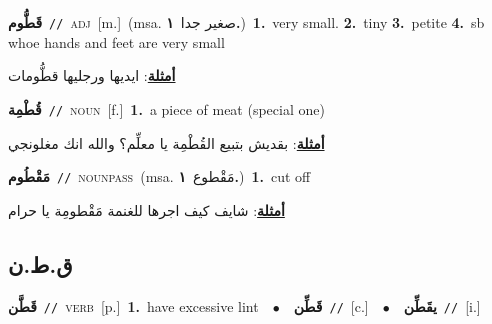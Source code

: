 \documentclass[10pt,a4paper,twoside]{article} %
\begin{document}
\begin{multicols}{2}
{\setlength\topsep{0pt}\textbf{\foreignlanguage{arabic}{قَطُّوم}}\ {\color{gray}\texttt{//}\color{black}}\ \textsc{adj}\ [m.]\ \color{gray}(msa. \foreignlanguage{arabic}{صغير جدا}~\foreignlanguage{arabic}{\textbf{١.}})\color{black}\ \textbf{1.}~very small.  \textbf{2.}~tiny  \textbf{3.}~petite  \textbf{4.}~sb whoe hands and feet are very small\  \begin{flushright}\color{gray}\foreignlanguage{arabic}{\textbf{\underline{\foreignlanguage{arabic}{أمثلة}}}: ايديها ورجليها قطُّومات}\end{flushright}\color{black}} \vspace{2mm}

{\setlength\topsep{0pt}\textbf{\foreignlanguage{arabic}{قُطْمِة}}\ {\color{gray}\texttt{//}\color{black}}\ \textsc{noun}\ [f.]\ \textbf{1.}~a piece of meat (special one)\  \begin{flushright}\color{gray}\foreignlanguage{arabic}{\textbf{\underline{\foreignlanguage{arabic}{أمثلة}}}: بقديش بتبيع القُطْمِة يا معلِّم؟ والله انك مغلونجي}\end{flushright}\color{black}} \vspace{2mm}

{\setlength\topsep{0pt}\textbf{\foreignlanguage{arabic}{مَقْطُوم}}\ {\color{gray}\texttt{//}\color{black}}\ \textsc{noun\textunderscore pass}\ \color{gray}(msa. \foreignlanguage{arabic}{مَقْطوع}~\foreignlanguage{arabic}{\textbf{١.}})\color{black}\ \textbf{1.}~cut off\  \begin{flushright}\color{gray}\foreignlanguage{arabic}{\textbf{\underline{\foreignlanguage{arabic}{أمثلة}}}: شايف كيف اجرها للغنمة مَقْطومِة يا حرام}\end{flushright}\color{black}} \vspace{2mm}

\vspace{-3mm}
\subsection*{\color{blue}\foreignlanguage{arabic}{ق.ط.ن}\color{blue}{}} 

{\setlength\topsep{0pt}\textbf{\foreignlanguage{arabic}{قَطَّن}}\ {\color{gray}\texttt{//}\color{black}}\ \textsc{verb}\ [p.]\ \textbf{1.}~have excessive lint\ \ $\bullet$\ \ \setlength\topsep{0pt}\textbf{\foreignlanguage{arabic}{قَطِّن}}\ {\color{gray}\texttt{//}\color{black}}\ [c.]\ \ $\bullet$\ \ \setlength\topsep{0pt}\textbf{\foreignlanguage{arabic}{يقَطِّن}}\ {\color{gray}\texttt{//}\color{black}}\ [i.]\ } \vspace{2mm}


\end{multicols}
\end{document}
